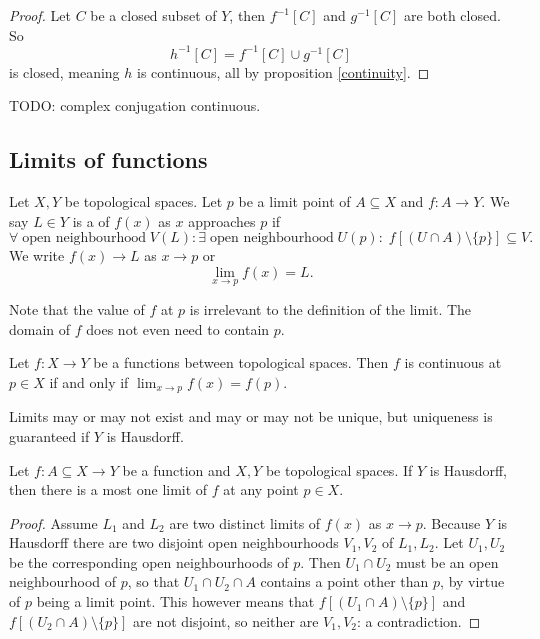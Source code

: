 \begin{proof}
Let $C$ be a closed subset of $Y$, then $f^{-1}[C]$ and $g^{-1}[C]$ are both closed. So
\[ h^{-1}[C] = f^{-1}[C]\cup g^{-1}[C] \]
is closed, meaning $h$ is continuous, all by proposition \ref{continuity}.
\end{proof}

TODO: complex conjugation continuous.

\subsection{Limits of functions}
\begin{definition}
Let $X,Y$ be topological spaces. Let $p$ be a limit point of $A\subseteq X$ and $f: A\to Y$. We say $L\in Y$ is a  of $f(x)$ as $x$ approaches $p$ if
\[ \forall\;\text{open neighbourhood}\; V(L):\exists \;\text{open neighbourhood}\; U(p):\; f[(U\cap A)\setminus \{p\}] \subseteq V. \]
We write $f(x)\to L$ as $x\to p$ or
\[ \lim_{x\to p}f(x) = L. \]
\end{definition}
Note that the value of $f$ at $p$ is irrelevant to the definition of the limit. The domain of $f$ does not even need to contain $p$.

\begin{proposition}
Let $f:X\to Y$ be a functions between topological spaces. Then $f$ is continuous at $p\in X$ \textup{if and only if} $\lim_{x\to p}f(x) = f(p)$.
\end{proposition}

Limits may or may not exist and may or may not be unique, but uniqueness is guaranteed if $Y$ is Hausdorff.
\begin{proposition} \label{HausdorffUniqueLimit}
Let $f: A\subseteq X\to Y$ be a function and $X,Y$ be topological spaces. If $Y$ is Hausdorff, then there is a most one limit of $f$ at any point $p\in X$.
\end{proposition}
\begin{proof}
Assume $L_1$ and $L_2$ are two distinct limits of $f(x)$ as $x\to p$. Because $Y$ is Hausdorff there are two disjoint open neighbourhoods $V_1, V_2$ of $L_1,L_2$. Let $U_1,U_2$ be the corresponding open neighbourhoods of $p$. Then $U_1\cap U_2$ must be an open neighbourhood of $p$, so that $U_1\cap U_2\cap A$ contains a point other than $p$, by virtue of $p$ being a limit point. This however means that $f[(U_1\cap A)\setminus \{p\}]$ and $f[(U_2\cap A)\setminus \{p\}]$ are not disjoint, so neither are $V_1,V_2$: a contradiction.
\end{proof}

